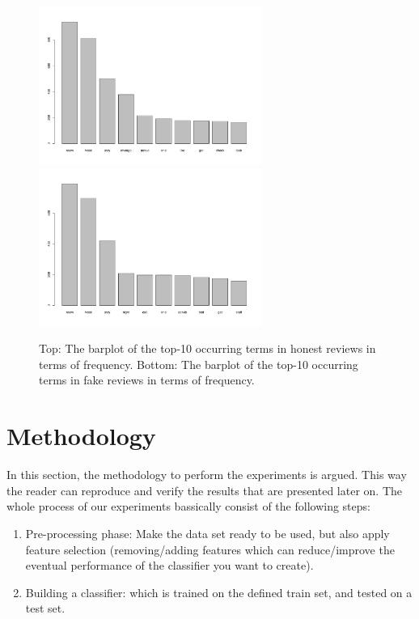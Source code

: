 \documentclass[a4paper,11pt]{article}
\begin{document}
\begin{figure}[H]
\label{figure:exploratory}
  \centering
      \includegraphics[width=0.65\textwidth]{honest}
      \includegraphics[width=0.65\textwidth]{fake}
  \caption{Top: The barplot of the top-10 occurring terms in honest reviews in terms of frequency. Bottom: The barplot of the top-10 occurring terms in fake reviews in terms of frequency.}
\end{figure}

\section{Methodology}
In this section, the methodology to perform the experiments is argued. This way the reader can reproduce and verify the results that are presented later on. %
The whole process of our experiments bassically consist of the following steps:
\begin{enumerate}
\item Pre-processing phase: Make the data set ready to be used, but also apply feature selection (removing/adding features which can reduce/improve the eventual performance of the classifier you want to create).
\item Building a classifier: which is trained on the defined train set, and tested on a test set.
\end{enumerate}
\end{document}
